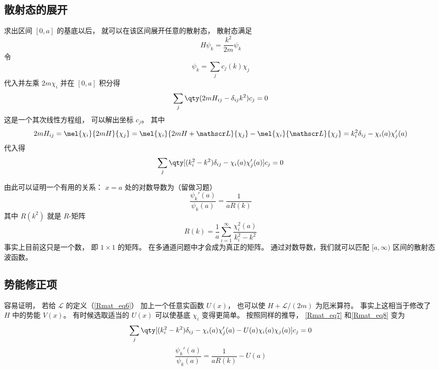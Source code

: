 \subsection{散射态的展开}
求出区间 $[0,a]$ 的基底以后， 就可以在该区间展开任意的散射态， 散射态满足
\begin{equation}\label{Rmat_eq4}
H\psi_k = \frac{k^2}{2m}\psi_k
\end{equation}
令
\begin{equation}\label{Rmat_eq5}
\psi_k = \sum_j c_j(k)\chi_j
\end{equation}
代入并左乘 $2m\chi_i$ 并在 $[0,a]$ 积分得
\begin{equation}
\sum_j \qty(2mH_{ij} - \delta_{ij}k^2) c_j = 0
\end{equation}
这是一个其次线性方程组， 可以解出坐标 $c_j$。 其中
\begin{equation}
2mH_{ij} = \mel{\chi_i}{2mH}{\chi_j} = \mel{\chi_i}{2mH + \mathscr L}{\chi_j} - \mel{\chi_i}{\mathscr L}{\chi_j} 
= k_i^2\delta_{ij} - \chi_i(a)\chi'_j(a)
\end{equation}
代入得
\begin{equation}\label{Rmat_eq7}
\sum_j \qty[(k_i^2 - k^2)\delta_{ij} - \chi_i(a)\chi'_j(a)] c_j = 0
\end{equation}

由此可以证明一个有用的关系： $x=a$ 处的对数导数为（留做习题）
\begin{equation}\label{Rmat_eq8}
\frac{\psi_k'(a)}{\psi_k(a)} = \frac{1}{aR(k)}
\end{equation}
其中 $R(k^2)$ 就是 $R$-矩阵
\begin{equation}
R(k) = \frac{1}{a} \sum_{i=1}^\infty \frac{\chi_i^2(a)}{k_i^2 - k^2}
\end{equation}
事实上目前这只是一个数， 即 $1\times 1$ 的矩阵。 在多通道问题中才会成为真正的矩阵。 通过对数导数，我们就可以匹配 $[a,\infty)$ 区间的散射态波函数。

\subsection{势能修正项}
容易证明， 若给 $\mathscr L$ 的定义（\autoref{Rmat_eq6}） 加上一个任意实函数 $U(x)$， 也可以使 $H+\mathscr L/(2m)$ 为厄米算符。 事实上这相当于修改了 $H$ 中的势能 $V(x)$。 有时候选取适当的 $U(x)$ 可以使基底 $\chi_i$ 变得更简单。 按照同样的推导， \autoref{Rmat_eq7} 和\autoref{Rmat_eq8} 变为
\begin{equation}
\sum_j \qty[(k_i^2 - k^2)\delta_{ij} - \chi_i(a)\chi'_j(a) - U(a)\chi_i(a)\chi_j(a)] c_j = 0
\end{equation}
\begin{equation}
\frac{\psi_k'(a)}{\psi_k(a)} = \frac{1}{aR(k)} - U(a)
\end{equation}
